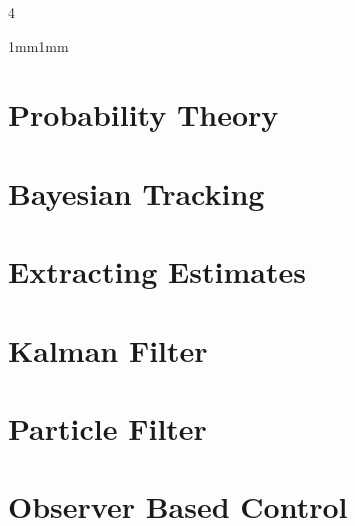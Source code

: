 \documentclass[8pt, a4paper, landscape]{extarticle}
\author{Fabio Bühler, fabuehle@ethz.ch}
\begin{document}
    \setlength{\columnseprule}{0.5pt} %
    \begin{multicols*}{4} %
    \begin{adjustwidth}{1mm}{1mm} %


        \section{Probability Theory}
            
            
            
            
            
        
        \section{Bayesian Tracking}
            
            
        
        \section{Extracting Estimates}
            
            
            
        \section{Kalman Filter}
            
            
        
        \section{Particle Filter}
            
            
            
            
        \section{Observer Based Control}
            
            
            

    \end{adjustwidth}%
    \end{multicols*}
\end{document}
